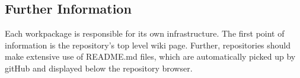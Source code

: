 \documentclass{template/openetcs_report}
\begin{document}
\subsection{Further Information}

Each workpackage is responsible for its own infrastructure. The first point of information is the repository's top level wiki page. Further, repositories should make extensive use of README.md files, which are automatically picked up by gitHub and displayed below the repository browser.




%  
%  

%  
%  

\end{document}
